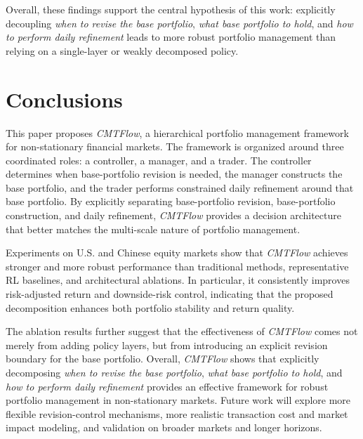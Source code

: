 \documentclass[letterpaper]{article} %
\begin{document}
Overall, these findings support the central hypothesis of this work: explicitly decoupling \emph{when to revise the base portfolio}, \emph{what base portfolio to hold}, and \emph{how to perform daily refinement} leads to more robust portfolio management than relying on a single-layer or weakly decomposed policy.


\section{Conclusions}

This paper proposes \textit{\textit{CMTFlow}}, a hierarchical portfolio management framework for non-stationary financial markets. The framework is organized around three coordinated roles: a controller, a manager, and a trader. The controller determines when base-portfolio revision is needed, the manager constructs the base portfolio, and the trader performs constrained daily refinement around that base portfolio. By explicitly separating base-portfolio revision, base-portfolio construction, and daily refinement, \textit{CMTFlow} provides a decision architecture that better matches the multi-scale nature of portfolio management.

Experiments on U.S. and Chinese equity markets show that \textit{CMTFlow} achieves stronger and more robust performance than traditional methods, representative RL baselines, and architectural ablations. In particular, it consistently improves risk-adjusted return and downside-risk control, indicating that the proposed decomposition enhances both portfolio stability and return quality.

The ablation results further suggest that the effectiveness of \textit{CMTFlow} comes not merely from adding policy layers, but from introducing an explicit revision boundary for the base portfolio. Overall, \textit{CMTFlow} shows that explicitly decomposing \emph{when to revise the base portfolio}, \emph{what base portfolio to hold}, and \emph{how to perform daily refinement} provides an effective framework for robust portfolio management in non-stationary markets. Future work will explore more flexible revision-control mechanisms, more realistic transaction cost and market impact modeling, and validation on broader markets and longer horizons.



% 
\end{document}
